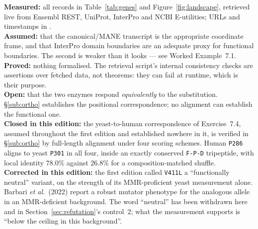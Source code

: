 \begin{ledger}
\textbf{Measured:} all records in Table~\ref{tab:genes} and
Figure~\ref{fig:landscape}, retrieved live from Ensembl REST, UniProt, InterPro
and NCBI E-utilities; URLs and timestamps in
. \\
\textbf{Assumed:} that the canonical/MANE transcript is the appropriate
coordinate frame, and that InterPro domain boundaries are an adequate proxy for
functional boundaries. The second is weaker than it looks --- see
Worked Example~7.1. \\
\textbf{Proved:} nothing formalised. The retrieval script's internal consistency
checks are assertions over fetched data, not theorems: they can fail at runtime,
which is their purpose. \\
\textbf{Open:} that the two enzymes respond \emph{equivalently} to the
substitution. \S\ref{sub:ortho} establishes the positional correspondence; no
alignment can establish the functional one. \\
\textbf{Closed in this edition:} the yeast-to-human correspondence of
Exercise~7.4, assumed throughout the first edition and established nowhere in
it, is verified in \S\ref{sub:ortho} by full-length alignment under four
scoring schemes. Human \texttt{P286} aligns to yeast \texttt{P301} in all four,
inside an exactly conserved \texttt{F-P-D} tripeptide, with local identity
$78.0\%$ against $26.8\%$ for a composition-matched shuffle. \\
\textbf{Corrected in this edition:} the first edition called \texttt{V411L} a
``functionally neutral'' variant, on the strength of its MMR-proficient yeast
measurement alone. Barbari \emph{et al.}\ (2022) report a robust mutator
phenotype for the analogous allele in an MMR-deficient background. The word
``neutral'' has been withdrawn here and in Section~\ref{sec:refutation}'s
control~2; what the measurement supports is ``below the ceiling in this
background''.
\end{ledger}
